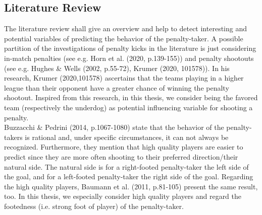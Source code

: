 \documentclass[12pt,dvipsnames]{article}%
\begin{document}
\subsection{Literature Review}
The literature review shall give an overview and help to detect interesting and potential variables of predicting the behavior of the penalty-taker. 
A possible partition of the investigations of penalty kicks in the literature is just considering in-match penalties (see e.g. Horn et al. (2020, p.139-155)) and penalty shootouts (see e.g. Hughes \& Wells (2002, p.55-72), Krumer (2020, 101578)). In his research, Krumer (2020,101578) ascertains that the teams playing in a higher league than their opponent have a greater chance of winning the penalty shootout. Inspired from this research, in this thesis, we consider being the favored team (respectively the underdog) as potential influencing variable for shooting a penalty. \\  
Buzzacchi \& Pedrini (2014, p.1067-1080) state that the behavior of the penalty-takers is rational and, under specific circumstances, it can not always be recognized.  Furthermore, they mention that high quality players are easier to predict since they are more often shooting  to their preferred direction/their natural side. The natural side is for a right-footed penalty-taker the left side of the goal, and for a left-footed penalty-taker the right side of the goal. Regarding the high quality players, Baumann et al. (2011, p.81-105) present the same result, too. In this thesis, we especially consider high quality players and regard the footedness (i.e. strong foot of player) of the penalty-taker. \\
%
\end{document}
